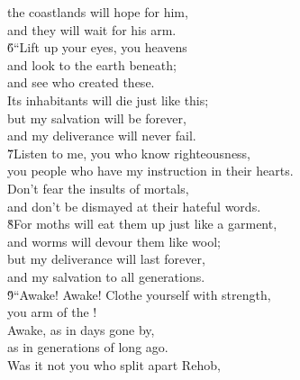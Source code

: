 \begin{poetry}
\poemll    the coastlands will hope for him, \\
\poemlll       and they will wait for his arm. \\
\poeml \v{6}``Lift up your eyes, you heavens \\
\poemll    and look to the earth beneath; \\
\poemlll       and see who created these. \\
\poeml Its inhabitants will die just like this; \\
\poemll    but my salvation will be forever, \\
\poemlll       and my deliverance will never fail. \\
\poeml \v{7}Listen to me, you who know righteousness, \\
\poemll    you people who have my instruction in their hearts. \\
\poeml Don't fear the insults of mortals, \\
\poemll    and don't be dismayed at their hateful words. \\
\poeml \v{8}For moths will eat them up just like a garment, \\
\poemll    and worms will devour them like wool; \\
\poeml but my deliverance will last forever, \\
\poemll    and my salvation to all generations. \\
\poeml \v{9}``Awake! Awake! Clothe yourself with strength, \\
\poemll    you arm of the ! \\
\poeml Awake, as in days gone by, \\
\poemll    as in generations of long ago. \\
\poeml Was it not you who split apart Rehob, \\

\end{poetry}
